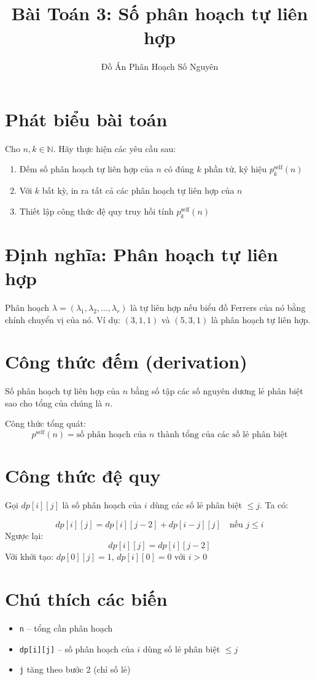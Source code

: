 \documentclass[12pt]{article}
\title{Bài Toán 3: Số phân hoạch tự liên hợp}
\author{Đồ Án Phân Hoạch Số Nguyên}
\date{}
\begin{document}
\maketitle

\section*{Phát biểu bài toán}
Cho $n, k \in \mathbb{N}$. Hãy thực hiện các yêu cầu sau:
\begin{enumerate}[label=(\alph*)]
    \item Đếm số phân hoạch tự liên hợp của $n$ có đúng $k$ phần tử, ký hiệu $p_k^{\text{self}}(n)$
    \item Với $k$ bất kỳ, in ra tất cả các phân hoạch tự liên hợp của $n$
    \item Thiết lập công thức đệ quy truy hồi tính $p_k^{\text{self}}(n)$
\end{enumerate}

\section*{Định nghĩa: Phân hoạch tự liên hợp}
Phân hoạch $\lambda = (\lambda_1, \lambda_2, \dots, \lambda_r)$ là tự liên hợp nếu biểu đồ Ferrers của nó bằng chính chuyển vị của nó. Ví dụ: $(3,1,1)$ và $(5,3,1)$ là phân hoạch tự liên hợp.

\section*{Công thức đếm (derivation)}
Số phân hoạch tự liên hợp của $n$ bằng số tập các số nguyên dương lẻ phân biệt sao cho tổng của chúng là $n$.

Công thức tổng quát:
\[
p^{\text{self}}(n) = \text{số phân hoạch của } n \text{ thành tổng của các số lẻ phân biệt}
\]

\section*{Công thức đệ quy}
Gọi $dp[i][j]$ là số phân hoạch của $i$ dùng các số lẻ phân biệt $\leq j$. Ta có:

\[
dp[i][j] = dp[i][j-2] + dp[i-j][j] \quad \text{nếu } j \leq i
\]
Ngược lại:
\[
dp[i][j] = dp[i][j-2]
\]
Với khởi tạo: $dp[0][j] = 1$, $dp[i][0] = 0$ với $i > 0$

\section*{Chú thích các biến}
\begin{itemize}
    \item \texttt{n} – tổng cần phân hoạch
    \item \texttt{dp[i][j]} – số phân hoạch của $i$ dùng số lẻ phân biệt $\leq j$
    \item \texttt{j} tăng theo bước 2 (chỉ số lẻ)
\end{itemize}
\end{document}
